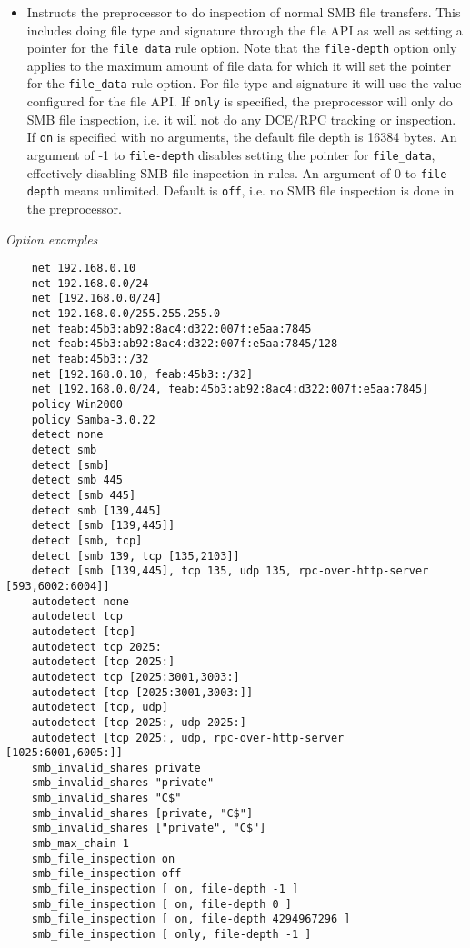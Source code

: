 \documentclass[english]{report}
\begin{document}
\begin{itemize}
\begin{itemize}
\item[] Instructs the preprocessor to do inspection of normal SMB file
transfers.  This includes doing file type and signature through
the file API as well as setting a pointer for the \texttt{file\_data}
rule option.  Note that the \texttt{file-depth} option only applies to the
maximum amount of file data for which it will set the pointer for the
\texttt{file\_data} rule option.  For file type and signature it will use the
value configured for the file API.  If \texttt{only} is specified, the
preprocessor will only do SMB file inspection, i.e. it will not do any DCE/RPC
tracking or inspection.  If \texttt{on} is specified with no
arguments, the default file depth is 16384 bytes.  An argument of -1 to
\texttt{file-depth} disables setting the pointer for \texttt{file\_data}, effectively
disabling SMB file inspection in rules.  An argument of 0 to
\texttt{file-depth} means unlimited.  Default is \texttt{off}, i.e. no SMB file
inspection is done in the preprocessor.

\end{itemize}

\end{itemize}

\textit{Option examples}
\footnotesize
\begin{verbatim}
    net 192.168.0.10
    net 192.168.0.0/24
    net [192.168.0.0/24]
    net 192.168.0.0/255.255.255.0
    net feab:45b3:ab92:8ac4:d322:007f:e5aa:7845
    net feab:45b3:ab92:8ac4:d322:007f:e5aa:7845/128
    net feab:45b3::/32
    net [192.168.0.10, feab:45b3::/32]
    net [192.168.0.0/24, feab:45b3:ab92:8ac4:d322:007f:e5aa:7845]
    policy Win2000
    policy Samba-3.0.22
    detect none
    detect smb
    detect [smb]
    detect smb 445
    detect [smb 445]
    detect smb [139,445]
    detect [smb [139,445]]
    detect [smb, tcp]
    detect [smb 139, tcp [135,2103]]
    detect [smb [139,445], tcp 135, udp 135, rpc-over-http-server [593,6002:6004]]
    autodetect none
    autodetect tcp
    autodetect [tcp]
    autodetect tcp 2025:
    autodetect [tcp 2025:]
    autodetect tcp [2025:3001,3003:]
    autodetect [tcp [2025:3001,3003:]]
    autodetect [tcp, udp]
    autodetect [tcp 2025:, udp 2025:]
    autodetect [tcp 2025:, udp, rpc-over-http-server [1025:6001,6005:]]
    smb_invalid_shares private
    smb_invalid_shares "private"
    smb_invalid_shares "C$"
    smb_invalid_shares [private, "C$"]
    smb_invalid_shares ["private", "C$"]
    smb_max_chain 1
    smb_file_inspection on
    smb_file_inspection off
    smb_file_inspection [ on, file-depth -1 ]
    smb_file_inspection [ on, file-depth 0 ]
    smb_file_inspection [ on, file-depth 4294967296 ]
    smb_file_inspection [ only, file-depth -1 ]
\end{verbatim}
\normalsize
\end{document}
